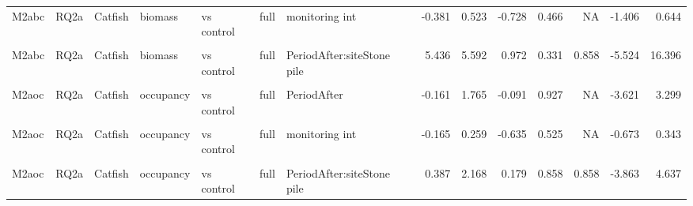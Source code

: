 \documentclass[
  12pt,
  a4paper,
  oneside]{scrbook}
\begin{document}
\begin{landscape}
\begin{longtable}[t]{lllllllrrrrrrr}
M2abc & RQ2a & Catfish & biomass & vs control & full & monitoring int & -0.381 & 0.523 & -0.728 & 0.466 & NA & -1.406 & 0.644\\
\cellcolor{gray!8}{M2abc} & \cellcolor{gray!8}{RQ2a} & \cellcolor{gray!8}{Catfish} & \cellcolor{gray!8}{biomass} & \cellcolor{gray!8}{vs control} & \cellcolor{gray!8}{full} & \cellcolor{gray!8}{fetch z} & \cellcolor{gray!8}{-1.675} & \cellcolor{gray!8}{2.438} & \cellcolor{gray!8}{-0.687} & \cellcolor{gray!8}{0.492} & \cellcolor{gray!8}{NA} & \cellcolor{gray!8}{-6.454} & \cellcolor{gray!8}{3.103}\\
M2abc & RQ2a & Catfish & biomass & vs control & full & PeriodAfter:siteStone pile & 5.436 & 5.592 & 0.972 & 0.331 & 0.858 & -5.524 & 16.396\\
\addlinespace
\cellcolor{gray!8}{M2aoc} & \cellcolor{gray!8}{RQ2a} & \cellcolor{gray!8}{Catfish} & \cellcolor{gray!8}{occupancy} & \cellcolor{gray!8}{vs control} & \cellcolor{gray!8}{full} & \cellcolor{gray!8}{(Intercept)} & \cellcolor{gray!8}{-2.185} & \cellcolor{gray!8}{1.887} & \cellcolor{gray!8}{-1.158} & \cellcolor{gray!8}{0.247} & \cellcolor{gray!8}{NA} & \cellcolor{gray!8}{-5.883} & \cellcolor{gray!8}{1.513}\\
M2aoc & RQ2a & Catfish & occupancy & vs control & full & PeriodAfter & -0.161 & 1.765 & -0.091 & 0.927 & NA & -3.621 & 3.299\\
\cellcolor{gray!8}{M2aoc} & \cellcolor{gray!8}{RQ2a} & \cellcolor{gray!8}{Catfish} & \cellcolor{gray!8}{occupancy} & \cellcolor{gray!8}{vs control} & \cellcolor{gray!8}{full} & \cellcolor{gray!8}{siteStone pile} & \cellcolor{gray!8}{0.024} & \cellcolor{gray!8}{1.982} & \cellcolor{gray!8}{0.012} & \cellcolor{gray!8}{0.990} & \cellcolor{gray!8}{NA} & \cellcolor{gray!8}{-3.860} & \cellcolor{gray!8}{3.909}\\
M2aoc & RQ2a & Catfish & occupancy & vs control & full & monitoring int & -0.165 & 0.259 & -0.635 & 0.525 & NA & -0.673 & 0.343\\
\cellcolor{gray!8}{M2aoc} & \cellcolor{gray!8}{RQ2a} & \cellcolor{gray!8}{Catfish} & \cellcolor{gray!8}{occupancy} & \cellcolor{gray!8}{vs control} & \cellcolor{gray!8}{full} & \cellcolor{gray!8}{fetch z} & \cellcolor{gray!8}{-0.960} & \cellcolor{gray!8}{1.197} & \cellcolor{gray!8}{-0.802} & \cellcolor{gray!8}{0.423} & \cellcolor{gray!8}{NA} & \cellcolor{gray!8}{-3.306} & \cellcolor{gray!8}{1.387}\\
\addlinespace
M2aoc & RQ2a & Catfish & occupancy & vs control & full & PeriodAfter:siteStone pile & 0.387 & 2.168 & 0.179 & 0.858 & 0.858 & -3.863 & 4.637\\

\end{longtable}
\end{landscape}
\end{document}
